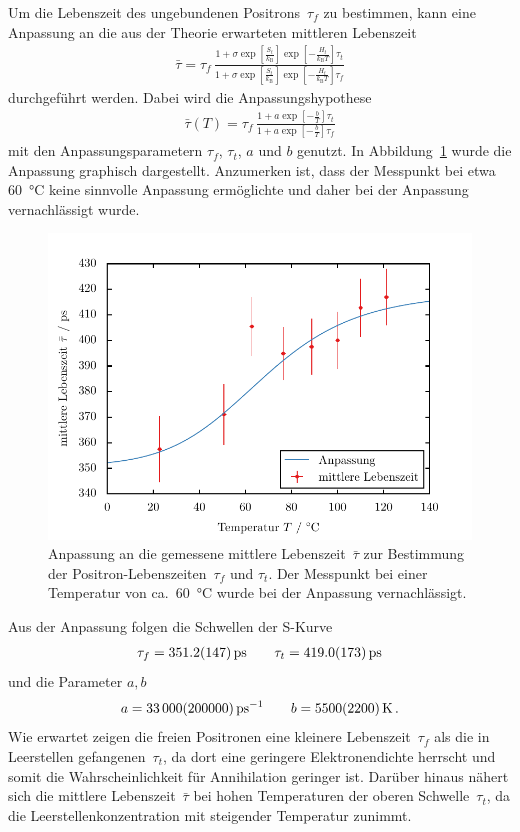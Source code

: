 \documentclass[11pt, a4paper]{article}
\numberwithin{equation}{section}
\begin{document}
Um die Lebenszeit des ungebundenen Positrons~$\tau_f$ zu bestimmen, kann eine Anpassung an die aus der Theorie erwarteten mittleren Lebenszeit 
\begin{align}
	\bar{\tau} = \tau_f \, \frac{1 + \sigma \exp\left[ \frac{S_t}{k_\mathrm{B}} \right] \exp\left[ -\frac{H_t}{k_\mathrm{B} T} \right] \tau_t}{1 + \sigma \exp\left[ \frac{S_t}{k_\mathrm{B}} \right] \exp\left[ -\frac{H_t}{k_\mathrm{B} T} \right] \tau_f}
	\label{fig:mean_lifetime}
\end{align}
durchgeführt werden.
Dabei wird die Anpassungshypothese
\begin{align*}
	\bar{\tau}(T) = \tau_f \, \frac{1 + a \exp\left[ -\frac{b}{T} \right] \tau_t}{1 + a \exp\left[ -\frac{b}{T} \right] \tau_f}
\end{align*}
mit den Anpassungsparametern $\tau_f$, $\tau_t$, $a$ und $b$ genutzt.
In Abbildung~\ref{fig:s_curve} wurde die Anpassung graphisch dargestellt.
Anzumerken ist, dass der Messpunkt bei etwa \SI{60}{\degreeCelsius} keine sinnvolle Anpassung ermöglichte und daher bei der Anpassung vernachlässigt wurde.
\begin{figure}[h]
	\centering
	\includegraphics{./figures/lifetime_s_curve.pdf}
	\caption{Anpassung an die gemessene mittlere Lebenszeit~$\bar{\tau}$ zur Bestimmung der Positron-Lebenszeiten~$\tau_f$ und $\tau_t$.
		     Der Messpunkt bei einer Temperatur von ca.\ \SI{60}{\degreeCelsius} wurde bei der Anpassung vernachlässigt.}
	\label{fig:s_curve}
\end{figure}
Aus der Anpassung folgen die Schwellen der S-Kurve
\begin{align*}
	\tau_f = \SI{351.2 +- 14.7}{ps} \qquad	\tau_t = \SI{419.0 +- 17.3}{ps}
\end{align*}
und die Parameter $a, b$
\begin{align*}
	a = \SI{33000 +- 200000}{\per\pico\second} \qquad b = \SI{5500 +- 2200}{\kelvin} \, \text{.}
\end{align*}
Wie erwartet zeigen die freien Positronen eine kleinere Lebenszeit~$\tau_f$ als die in Leerstellen gefangenen~$\tau_t$, da dort eine geringere Elektronendichte herrscht und somit die Wahrscheinlichkeit für Annihilation geringer ist.
Darüber hinaus nähert sich die mittlere Lebenszeit~$\bar{\tau}$ bei hohen Temperaturen der oberen Schwelle~$\tau_t$, da die Leerstellenkonzentration mit steigender Temperatur zunimmt.
\end{document}
